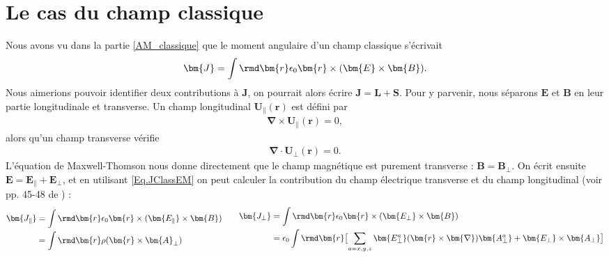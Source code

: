 \section{Le cas du champ classique}
Nous avons vu dans la partie \ref{AM_classique} que le moment angulaire d'un champ classique s'écrivait 
\begin{equation}
\bm{J}=\int{\rmd\bm{r}\epsilon_0\bm{r}\times(\bm{E}\times\bm{B})}.
\label{Eq.JClassEM}
\end{equation} 
Nous aimerions pouvoir identifier deux contributions à $\bm{J}$, on pourrait alors écrire $\bm{J}=\bm{L}+\bm{S}$. Pour y parvenir, nous séparons $\bm{E}$ et $\bm{B}$ en leur partie longitudinale et transverse. Un champ longitudinal $\bm{U_{\parallel}}(\bm{r})$ est défini par 
\begin{align*}
\bm{\nabla}\times\bm{U_{\parallel}}(\bm{r})=0,
\end{align*}
alors qu'un champ transverse vérifie 
\begin{align*}
\bm{\nabla}\cdot\bm{U_{\bot}}(\bm{r})=0.
\end{align*}
L'équation de Maxwell-Thomson nous donne directement que le champ magnétique est purement transverse : $\bm{B}=\bm{B_{\bot}}$. On écrit ensuite $\bm{E}=\bm{E_{\parallel}}+\bm{E_{\bot}}$, et en utilisant \ref{Eq.JClassEM} on peut calculer la contribution du champ électrique transverse et du champ longitudinal (voir pp. 45-48 de ) :
\begin{equation*}
\begin{aligned}[c]
\bm{J_{\parallel}}&=\int{\rmd\bm{r}\epsilon_0\bm{r}\times(\bm{E_{\parallel}}\times\bm{B})} \\
&=\int{\rmd\bm{r}\rho(\bm{r}\times\bm{A}_{\bot})}
\end{aligned}
\qquad
\begin{aligned}[c]
\bm{J_{\bot}}&=\int{\rmd\bm{r}\epsilon_0\bm{r}\times(\bm{E_{\bot}}\times\bm{B})}\\
&=\epsilon_0\int{\rmd\bm{r}\bigl[\sum_{a=x,y,z} \bm{E^a_{\bot}}(\bm{r}\times\bm{\nabla})\bm{A^a_{\bot}}+\bm{E_{\bot}}\times\bm{A_{\bot}}\bigr]}
\end{aligned}
\end{equation*} 

